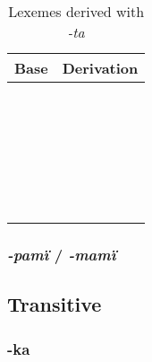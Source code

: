 \documentclass{memoir}
\begin{document}
\begin{table}[h]
\caption{Lexemes derived with \emph{-ta}}
\label{tab:tavbz}
\centering
\begin{tabular}{ll}
\toprule
Base & Derivation \\
\midrule
     &            \\
     &            \\
     &            \\
     &            \\
     &            \\
     &            \\
     &            \\
     &            \\
     &            \\
     &            \\
     &            \\
     &            \\
     &            \\
     &            \\
     &            \\
     &            \\
     &            \\
     &            \\
     &            \\
     &            \\
     &            \\
     &            \\
     &            \\
     &            \\
     &            \\
     &            \\
\bottomrule
\end{tabular}

\end{table}

\subsubsection{\texorpdfstring{\emph{-pamï} /
\emph{-mamï}}{-pamï / -mamï}}

\subsection{Transitive}

\subsubsection{\texorpdfstring{-ka \label{sec:kavbz}}{-ka }}
\end{document}
